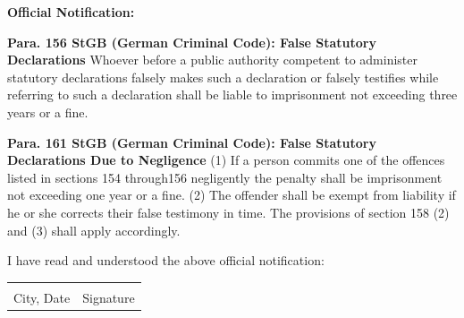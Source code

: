 \vfill
\small
\textbf{Official Notification:}

\footnotesize
\textbf{Para. 156 StGB (German Criminal Code): False Statutory Declarations} \newline
Whoever  before  a  public  authority  competent  to  administer  statutory  declarations  falsely  makes  such  a  declaration  or  falsely testifies while referring to such a declaration shall be liable to imprisonment not exceeding three years or a fine.

\textbf{Para. 161 StGB (German Criminal Code): False Statutory Declarations Due to Negligence} \newline
(1) If a person commits one of the offences listed in sections 154 through156 negligently the penalty shall be imprisonment not exceeding one year or a fine.
(2) The offender shall be exempt from liability if he or she corrects their false testimony in time. The provisions of section 158 (2) and (3) shall apply accordingly.

\normalsize
\vfill
I have read and understood the above official notification:

\hspace{-0.35cm}
\begin{tabular}{p{\TabLength}c}
	\underbar{Aachen, \varDate\hspace{\DateLength}}&\underbar{\hspace{4cm}}\\
	City, Date&Signature
\end{tabular}
\newpage
\thispagestyle{empty}
